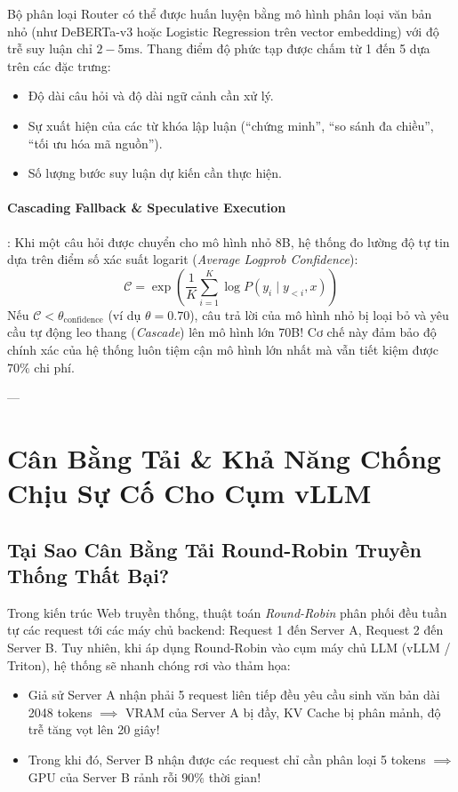 Bộ phân loại Router có thể được huấn luyện bằng mô hình phân loại văn bản nhỏ (như DeBERTa-v3 hoặc Logistic Regression trên vector embedding) với độ trễ suy luận chỉ $2 - 5\text{ms}$. Thang điểm độ phức tạp được chấm từ 1 đến 5 dựa trên các đặc trưng:
\begin{itemize}
  \item Độ dài câu hỏi và độ dài ngữ cảnh cần xử lý.
  \item Sự xuất hiện của các từ khóa lập luận (``chứng minh'', ``so sánh đa chiều'', ``tối ưu hóa mã nguồn'').
  \item Số lượng bước suy luận dự kiến cần thực hiện.
\end{itemize}

\paragraph{Cascading Fallback \& Speculative Execution}:
Khi một câu hỏi được chuyển cho mô hình nhỏ 8B, hệ thống đo lường độ tự tin dựa trên điểm số xác suất logarit (\textit{Average Logprob Confidence}):
\begin{equation}
\mathcal{C} = \exp\left( \frac{1}{K} \sum_{i=1}^K \log P(y_i \mid y_{<i}, x) \right)
\label{eq:logprob-confidence}
\end{equation}
Nếu $\mathcal{C} < \theta_{\text{confidence}}$ (ví dụ $\theta = 0.70$), câu trả lời của mô hình nhỏ bị loại bỏ và yêu cầu tự động leo thang (\textit{Cascade}) lên mô hình lớn 70B! Cơ chế này đảm bảo độ chính xác của hệ thống luôn tiệm cận mô hình lớn nhất mà vẫn tiết kiệm được $70\%$ chi phí.

---

\section{Cân Bằng Tải \& Khả Năng Chống Chịu Sự Cố Cho Cụm vLLM}
\label{sec:ch13-load-balancing}

\subsection{Tại Sao Cân Bằng Tải Round-Robin Truyền Thống Thất Bại?}
Trong kiến trúc Web truyền thống, thuật toán \textit{Round-Robin} phân phối đều tuần tự các request tới các máy chủ backend: Request 1 đến Server A, Request 2 đến Server B.
Tuy nhiên, khi áp dụng Round-Robin vào cụm máy chủ LLM (vLLM / Triton), hệ thống sẽ nhanh chóng rơi vào thảm họa:
\begin{itemize}
  \item Giả sử Server A nhận phải 5 request liên tiếp đều yêu cầu sinh văn bản dài 2048 tokens $\implies$ VRAM của Server A bị đầy, KV Cache bị phân mảnh, độ trễ tăng vọt lên 20 giây!
  \item Trong khi đó, Server B nhận được các request chỉ cần phân loại 5 tokens $\implies$ GPU của Server B rảnh rỗi $90\%$ thời gian!
\end{itemize}

